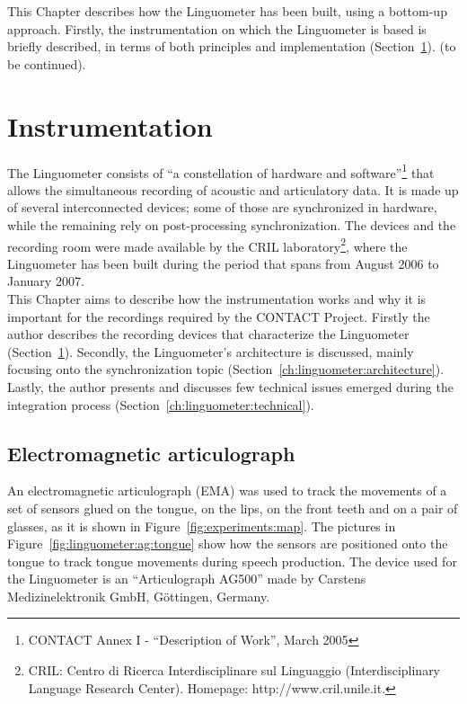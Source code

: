 This Chapter describes how the Linguometer has been built, using a bottom-up
approach. 
Firstly, the instrumentation on which the Linguometer is based is briefly
described, in terms of both principles and implementation
(Section~\ref{ch:linguometer:instrumentation}).
(to be continued). 
\section{Instrumentation}
\label{ch:linguometer:instrumentation}
The Linguometer consists of ``a constellation of hardware and
software''\footnote{CONTACT Annex I - ``Description of Work'',
March 2005} that allows the simultaneous recording of acoustic and articulatory
data.
It is made up of several interconnected devices; some of those are 
synchronized in hardware, while the remaining rely on post-processing
synchronization.
The devices and the recording room were made available by the CRIL 
laboratory\footnote{CRIL: Centro di Ricerca Interdisciplinare sul Linguaggio 
(Interdisciplinary Language Research Center).
Homepage: http://www.cril.unile.it.},
where the Linguometer has been built during the period that spans
from August 2006 to January 2007.\\
This Chapter aims to describe how the instrumentation works and why it is
important for the recordings required by the CONTACT Project.
Firstly the author describes the recording devices that characterize the
Linguometer (Section~\ref{ch:linguometer:instrumentation}).
Secondly, the Linguometer's architecture is discussed, mainly focusing onto the
synchronization topic (Section~\ref{ch:linguometer:architecture}).
Lastly, the author presents and discusses few technical issues emerged during
the integration process (Section~\ref{ch:linguometer:technical}).
\subsection{Electromagnetic articulograph}
\label{sec:linguometer:instrumentation:ag}
An electromagnetic articulograph (EMA) was used to track the movements of a set
of sensors glued on the tongue, on the lips, on the front teeth and on 
a pair of glasses, as it is shown in Figure~\ref{fig:experiments:map}.
The pictures in Figure~\ref{fig:linguometer:ag:tongue} show how the sensors are
positioned onto the tongue to track tongue movements during speech production.
The device used for the Linguometer is an ``Articulograph AG500'' made by
Carstens Medizinelektronik GmbH, G\"ottingen, Germany.

